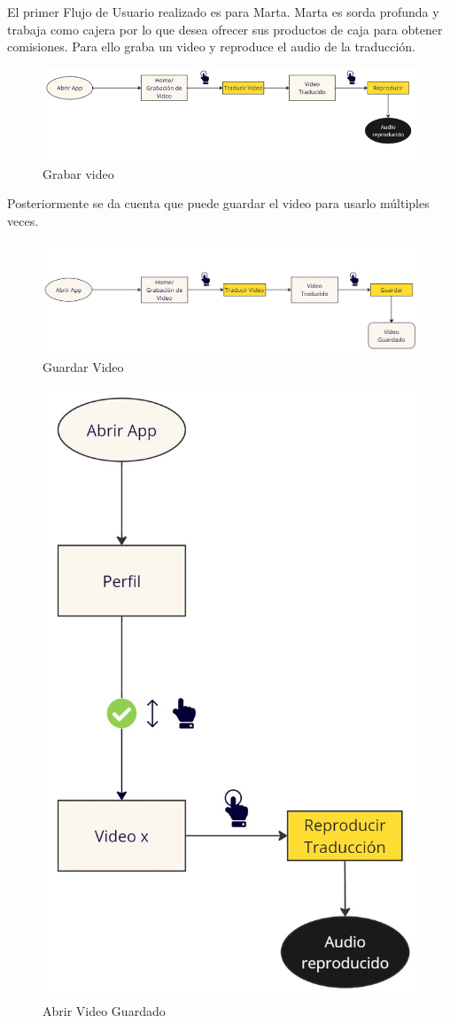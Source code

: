 El primer Flujo de Usuario realizado es para Marta. Marta es sorda profunda y trabaja como cajera por lo que desea ofrecer sus productos de caja para obtener comisiones. Para ello graba un video y reproduce el audio de la traducción. 

\begin{figure} [H]
    \centering
    \includegraphics[width=1\linewidth]{figuras/flujo_usuario1.png}
    \caption{Grabar video}
    \label{fig:enter-label}
\end{figure}

Posteriormente se da cuenta que puede guardar el video para usarlo múltiples veces.

\begin{figure} [H]
        \centering
        \includegraphics[width=1\linewidth]{figuras/flujo_usuario_2_correcto.jpg}
        \caption{Guardar Video}
        \label{fig:enter-label}
\end{figure}
        


\begin{figure} [H]
    \centering
    \includegraphics[width=0.4\linewidth]{figuras/flujo_usuario3.jpg}
    \caption{Abrir Video Guardado}
    \label{fig:enter-label}
\end{figure}


